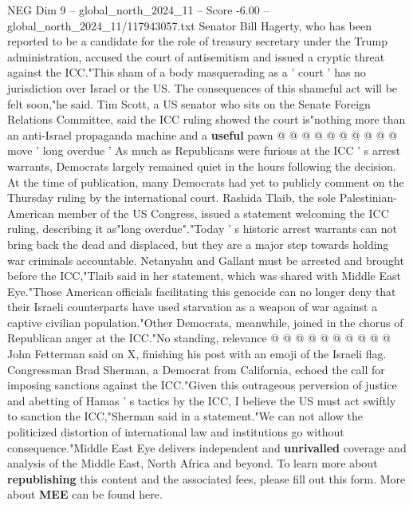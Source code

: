 \begin{textsample}{NEG Dim 9 – global\_north\_2024\_11 – Score -6.00 – global\_north\_2024\_11/117943057.txt}
Senator Bill Hagerty, who has been reported to be a candidate for the role of treasury secretary under the Trump administration, accused the court of antisemitism and issued a cryptic threat against the ICC."This sham of a body masquerading as a ' court ' has no jurisdiction over Israel or the US.
The consequences of this shameful act will be felt soon,"he said.
Tim Scott, a US senator who sits on the Senate Foreign Relations Committee, said the ICC ruling showed the court is"nothing more than an anti-Israel propaganda machine and a \textbf{useful} pawn @ @ @ @ @ @ @ @ @ @ move ' long overdue ' As much as Republicans were furious at the ICC ' s arrest warrants, Democrats largely remained quiet in the hours following the decision.
At the time of publication, many Democrats had yet to publicly comment on the Thursday ruling by the international court.
Rashida Tlaib, the sole Palestinian-American member of the US Congress, issued a statement welcoming the ICC ruling, describing it as"long overdue"."Today ' s historic arrest warrants can not bring back the dead and displaced, but they are a major step towards holding war criminals accountable.
Netanyahu and Gallant must be arrested and brought before the ICC,"Tlaib said in her statement, which was shared with Middle East Eye."Those American officials facilitating this genocide can no longer deny that their Israeli counterparts have used starvation as a weapon of war against a captive civilian population."Other Democrats, meanwhile, joined in the chorus of Republican anger at the ICC."No standing, relevance @ @ @ @ @ @ @ @ @ @ John Fetterman said on X, finishing his post with an emoji of the Israeli flag.
Congressman Brad Sherman, a Democrat from California, echoed the call for imposing sanctions against the ICC."Given this outrageous perversion of justice and abetting of Hamas ' s tactics by the ICC, I believe the US must act swiftly to sanction the ICC,"Sherman said in a statement."We can not allow the politicized distortion of international law and institutions go without consequence."Middle East Eye delivers independent and \textbf{unrivalled} coverage and analysis of the Middle East, North Africa and beyond.
To learn more about \textbf{republishing} this content and the associated fees, please fill out this form.
More about \textbf{MEE} can be found here.

\end{textsample}
